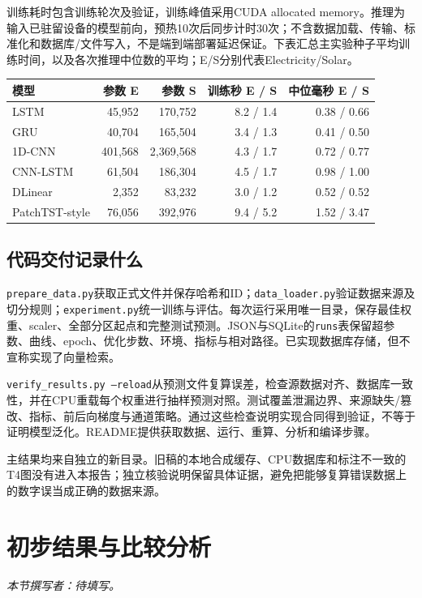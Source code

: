 \documentclass[10pt,a4paper]{article}
\begin{document}
训练耗时包含训练轮次及验证，训练峰值采用CUDA allocated memory。推理为输入已驻留设备的模型前向，预热10次后同步计时30次；不含数据加载、传输、标准化和数据库/文件写入，不是端到端部署延迟保证。下表汇总主实验种子平均训练时间，以及各次推理中位数的平均；E/S分别代表Electricity/Solar。
\begin{center}\small
\begin{tabular}{lrrrr}\toprule
模型 & 参数 E & 参数 S & 训练秒 E / S & 中位毫秒 E / S\\\midrule
LSTM & 45,952 & 170,752 & 8.2 / 1.4 & 0.38 / 0.66\\
GRU & 40,704 & 165,504 & 3.4 / 1.3 & 0.41 / 0.50\\
1D-CNN & 401,568 & 2,369,568 & 4.3 / 1.7 & 0.72 / 0.77\\
CNN-LSTM & 61,504 & 186,304 & 4.5 / 1.7 & 0.98 / 1.00\\
DLinear & 2,352 & 83,232 & 3.0 / 1.2 & 0.52 / 0.52\\
PatchTST-style & 76,056 & 392,976 & 9.4 / 5.2 & 1.52 / 3.47\\
\bottomrule\end{tabular}\end{center}

\subsection{代码交付记录什么}
\texttt{prepare\_data.py}获取正式文件并保存哈希和ID；\texttt{data\_loader.py}验证数据来源及切分规则；\texttt{experiment.py}统一训练与评估。每次运行采用唯一目录，保存最佳权重、scaler、全部分区起点和完整测试预测。JSON与SQLite的\texttt{runs}表保留超参数、曲线、epoch、优化步数、环境、指标与相对路径。已实现数据库存储，但不宣称实现了向量检索。

\texttt{verify\_results.py --reload}从预测文件复算误差，检查源数据对齐、数据库一致性，并在CPU重载每个权重进行抽样预测对照。测试覆盖泄漏边界、来源缺失/篡改、指标、前后向梯度与通道策略。通过这些检查说明实现合同得到验证，不等于证明模型泛化。README提供获取数据、运行、重算、分析和编译步骤。

主结果均来自独立的新目录。旧稿的本地合成缓存、CPU数据库和标注不一致的T4图没有进入本报告；独立核验说明保留具体证据，避免把能够复算错误数据上的数字误当成正确的数据来源。

\clearpage
\section{初步结果与比较分析}
\noindent\textit{本节撰写者：待填写。}
\end{document}
